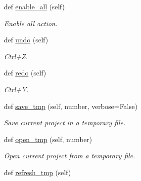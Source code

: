 \begin{DoxyCompactItemize}
def \mbox{\hyperlink{classInterface_1_1Window_a1cf47f78850ee14db6d1c48318962583}{enable\+\_\+all}} (self)
\begin{DoxyCompactList}\small\item\em Enable all action. \end{DoxyCompactList}\item 
\mbox{\label{classInterface_1_1Window_a9e3628e563e61eca6b2e5309ac865667}} 
def \mbox{\hyperlink{classInterface_1_1Window_a9e3628e563e61eca6b2e5309ac865667}{undo}} (self)
\begin{DoxyCompactList}\small\item\em Ctrl+Z. \end{DoxyCompactList}\item 
\mbox{\label{classInterface_1_1Window_a5c685ffb5ef323c4760e9a09a3bce8bb}} 
def \mbox{\hyperlink{classInterface_1_1Window_a5c685ffb5ef323c4760e9a09a3bce8bb}{redo}} (self)
\begin{DoxyCompactList}\small\item\em Ctrl+Y. \end{DoxyCompactList}\item 
\mbox{\label{classInterface_1_1Window_a23188a270f6898bc2ac7cda5be21bcb1}} 
def \mbox{\hyperlink{classInterface_1_1Window_a23188a270f6898bc2ac7cda5be21bcb1}{save\+\_\+tmp}} (self, number, verbose=False)
\begin{DoxyCompactList}\small\item\em Save current project in a temporary file. \end{DoxyCompactList}\item 
\mbox{\label{classInterface_1_1Window_a677cce50a132f54a5f4557467f8b7e01}} 
def \mbox{\hyperlink{classInterface_1_1Window_a677cce50a132f54a5f4557467f8b7e01}{open\+\_\+tmp}} (self, number)
\begin{DoxyCompactList}\small\item\em Open current project from a temporary file. \end{DoxyCompactList}\item 
\mbox{\label{classInterface_1_1Window_adeb4def32792ddd3dba86a382e4df195}} 
def \mbox{\hyperlink{classInterface_1_1Window_adeb4def32792ddd3dba86a382e4df195}{refresh\+\_\+tmp}} (self)

\end{DoxyCompactItemize}
